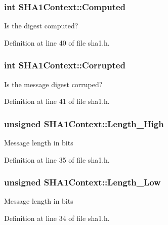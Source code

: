 \subsubsection[{Computed}]{\setlength{\rightskip}{0pt plus 5cm}int S\+H\+A1\+Context\+::\+Computed}\label{structSHA1Context_a3722d8be51c7a1a4e8083c3f1a5adfa1}
Is the digest computed? 

Definition at line 40 of file sha1.\+h.

\hypertarget{structSHA1Context_af549987a735051dc4b3b50b106fde5bb}{}
\subsubsection[{Corrupted}]{\setlength{\rightskip}{0pt plus 5cm}int S\+H\+A1\+Context\+::\+Corrupted}\label{structSHA1Context_af549987a735051dc4b3b50b106fde5bb}
Is the message digest corruped? 

Definition at line 41 of file sha1.\+h.

\hypertarget{structSHA1Context_afed0372c5ff46f0005c1595c0cc029fb}{}
\subsubsection[{Length\+\_\+\+High}]{\setlength{\rightskip}{0pt plus 5cm}unsigned S\+H\+A1\+Context\+::\+Length\+\_\+\+High}\label{structSHA1Context_afed0372c5ff46f0005c1595c0cc029fb}
Message length in bits 

Definition at line 35 of file sha1.\+h.

\hypertarget{structSHA1Context_abefecf979a4abf17d8783c32232d6b09}{}
\subsubsection[{Length\+\_\+\+Low}]{\setlength{\rightskip}{0pt plus 5cm}unsigned S\+H\+A1\+Context\+::\+Length\+\_\+\+Low}\label{structSHA1Context_abefecf979a4abf17d8783c32232d6b09}
Message length in bits 

Definition at line 34 of file sha1.\+h.

\hypertarget{structSHA1Context_ac29c71f56046f207c9c0f7bcc0bd8a2e}{}

